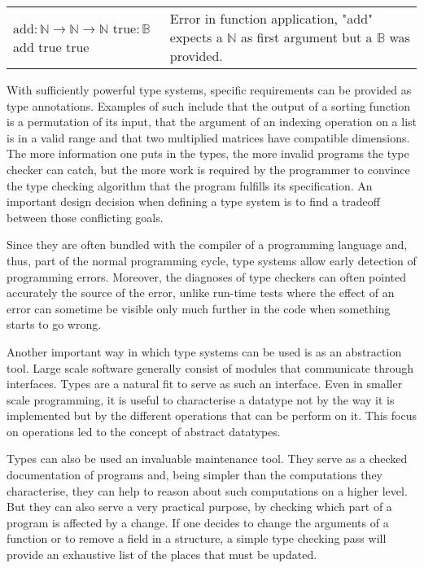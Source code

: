 \begin{center}
  \begin{tabular}{m{3.5cm} | m{5.5cm}}
    $\text{add} : \mathbb{N} \to \mathbb{N} \to \mathbb{N}$ \newline
    $\text{true} : \mathbb{B}$ \newline
    add true true
    & Error in function application, "add" expects a $\mathbb{N}$ as first argument but a
    $\mathbb{B}$ was provided.
  \end{tabular}
\end{center}

With sufficiently powerful type systems, specific requirements can be provided as type annotations.
Examples of such include that the output of a sorting function is a permutation of its input, that
the argument of an indexing operation on a list is in a valid range and that two multiplied matrices
have compatible dimensions. The more information one puts in the types, the more invalid programs
the type checker can catch, but the more work is required by the programmer to convince the
type checking algorithm that the program fulfills its specification. An important design decision
when defining a type system is to find a tradeoff between those conflicting goals.

Since they are often bundled with the compiler of a programming language and, thus, part of the
normal programming cycle, type systems allow early detection of programming errors. Moreover, the
diagnoses of type checkers can often pointed accurately the source of the error, unlike run-time
tests where the effect of an error can sometime be visible only much further in the code when
something starts to go wrong.

Another important way in which type systems can be used is as an abstraction tool. Large scale
software generally consist of modules that communicate through interfaces. Types are a natural fit
to serve as such an interface. Even in smaller scale programming, it is useful to characterise a
datatype not by the way it is implemented but by the different operations that can be perform on it.
This focus on operations led to the concept of abstract datatypes.

Types can also be used an invaluable maintenance tool. They serve as a checked documentation of
programs and, being simpler than the computations they characterise, they can help to reason about
such computations on a higher level. But they can also serve a very practical purpose, by checking
which part of a program is affected by a change. If one decides to change the arguments of a
function or to remove a field in a structure, a simple type checking pass will provide an exhaustive
list of the places that must be updated.

